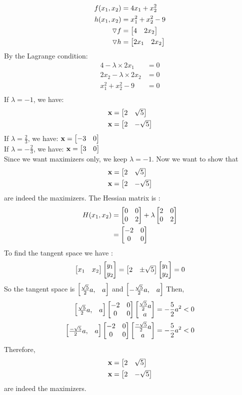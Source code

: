 \documentclass{article}
\begin{document}
\begin{align*} 
f(x_1,x_2)  & = 4x_1 + x_2^2 \\
h(x_1, x_2) & = x_1^2 + x_2^2 - 9 \\ 
\triangledown f  & = \begin{bmatrix}  4 &  2x_2 \end{bmatrix}  \\
\triangledown h & = \begin{bmatrix} 2x_1 & 2x_2  \end{bmatrix} \\
\end{align*} 
By the Lagrange condition:  \begin{align*} 
4-\lambda\times 2 x_1 & = 0 \\
2x_2 -\lambda\times 2 x_2 & = 0 \\
x_1^2 + x_2^2 - 9 & = 0 \\ 
\end{align*} 
If $\lambda = -1 $, we have: 
\begin{align*} 
\boldsymbol{\mathrm{x}} &= \begin{bmatrix} 2 & \sqrt{5}  \end{bmatrix} \\
\boldsymbol{\mathrm{x}} &= \begin{bmatrix} 2 & -\sqrt{5}  \end{bmatrix} 
\end{align*} 
If $\lambda = \frac{2}{3}$, we have:  $\boldsymbol{\mathrm{x}} = \begin{bmatrix} -3 & 0  \end{bmatrix}  $ \\
If $\lambda = -\frac{2}{3}$, we have:  $\boldsymbol{\mathrm{x}} = \begin{bmatrix} 3 & 0  \end{bmatrix}  $ \\
Since we want maximizers only, we keep $\lambda = -1$. Now we want to show that 
\begin{align*}
\boldsymbol{\mathrm{x}} &= \begin{bmatrix} 2 & \sqrt{5}  \end{bmatrix}\\
 \boldsymbol{\mathrm{x}} &= \begin{bmatrix} 2 & -\sqrt{5}  \end{bmatrix} 
 \end{align*}  are indeed the maximizers. 
The Hessian matrix is :
\begin{align*} 
H(x_1, x_2) &= \begin{bmatrix} 0 & 0 \\ 0 & 2  \end{bmatrix} + \lambda\begin{bmatrix} 2 & 0 \\ 0 & 2  \end{bmatrix} \\
& = \begin{bmatrix} -2 & 0 \\ 0 & 0  \end{bmatrix}
 \end{align*}
 To find the tangent space we have : 
 \begin{align*} 
 \begin{bmatrix} x_1 & x_2  \end{bmatrix} \begin{bmatrix} y_1 \\ y_2  \end{bmatrix} 
 =  \begin{bmatrix} 2 & \pm\sqrt{5}  \end{bmatrix} \begin{bmatrix} y_1 \\ y_2  \end{bmatrix}  = 0 
 \end{align*}
 So the tangent space is $\begin{bmatrix} \frac{\sqrt{5}}{2}a, & a  \end{bmatrix} $ and $\begin{bmatrix} -\frac{\sqrt{5}}{2}a, & a  \end{bmatrix} $ 
 Then, \begin{align*}
 \begin{bmatrix} \frac{\sqrt{5}}{2}a, &a \end{bmatrix} \begin{bmatrix} -2 & 0 \\ 0 & 0  \end{bmatrix} \begin{bmatrix} \frac{\sqrt{5}}{2}a \\a \end{bmatrix} &= -\frac{5}{2}a^2 < 0 \\
 \begin{bmatrix} \frac{-\sqrt{5}}{2}a, &a \end{bmatrix} \begin{bmatrix} -2 & 0 \\ 0 & 0  \end{bmatrix} \begin{bmatrix} \frac{-\sqrt{5}}{2}a \\a \end{bmatrix} &= -\frac{5}{2}a^2 < 0 
 \end{align*} 
 Therefore, \begin{align*}
\boldsymbol{\mathrm{x}} &= \begin{bmatrix} 2 & \sqrt{5}  \end{bmatrix}\\
 \boldsymbol{\mathrm{x}} &= \begin{bmatrix} 2 & -\sqrt{5}  \end{bmatrix} 
 \end{align*}  are indeed the maximizers.
 
\end{document}
